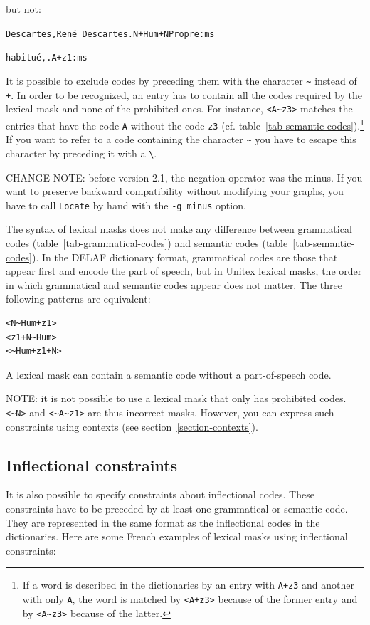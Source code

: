 \bigskip
\noindent but not:

\bigskip
\noindent
\texttt{Descartes,Ren\'e Descartes.N+Hum+NPropre:ms}

\noindent
\texttt{habitu\'e,.A+z1:ms}

\bigskip
\noindent It is possible to exclude codes by preceding them with the character \verb+~+
instead of \verb$+$.
In order to be recognized, an entry has to contain all the
codes required by the lexical mask and none of the prohibited ones. For instance,
\verb+<A~z3>+ matches the entries that have the code \verb+A+ without the code
\verb+z3+ (cf. table~\ref{tab-semantic-codes}).\footnote{If a word is described in the
dictionaries by an entry with \texttt{A+z3} and another with only \texttt{A}, the word
is matched by \texttt{<A+z3>} because of the former entry and by
\texttt{<A{\textasciitilde}z3>} because of the latter.}
If you want to refer to a code containing the character \verb$~$ you have to
escape this character by preceding it with a \verb+\+. 

\bigskip
\noindent CHANGE NOTE: before version 2.1, the negation operator was the minus. If you want
                       to preserve backward compatibility without modifying your graphs, you have
                       to call \verb+Locate+ by hand with the \verb+-g minus+ option.
\index{\verb+~+}

\bigskip
\noindent The syntax of lexical masks does not make any difference between grammatical codes
(table~\ref{tab-grammatical-codes}) and semantic codes (table~\ref{tab-semantic-codes}).
In the DELAF dictionary format, grammatical codes are those that appear first and
encode the part of speech, but in Unitex lexical masks,
the order in which grammatical and semantic codes appear does not matter. The
three following patterns are equivalent:

\begin{verbatim}
<N~Hum+z1>
<z1+N~Hum>
<~Hum+z1+N>
\end{verbatim}

\noindent A lexical mask can contain a semantic code without a part-of-speech code.

\bigskip
\noindent NOTE: it is not possible to use a lexical mask that only has
prohibited codes. \verb+<~N>+ and \verb+<~A~z1>+ are thus incorrect masks. 
However, you can express
such constraints using contexts (see section~\ref{section-contexts}).


\subsection{Inflectional constraints}
It is also possible to specify constraints about inflectional codes. These
constraints have to be preceded by at least one grammatical or semantic code.
They are represented in the same format as the inflectional codes in the dictionaries.
Here are some French examples of lexical masks using inflectional
constraints:

